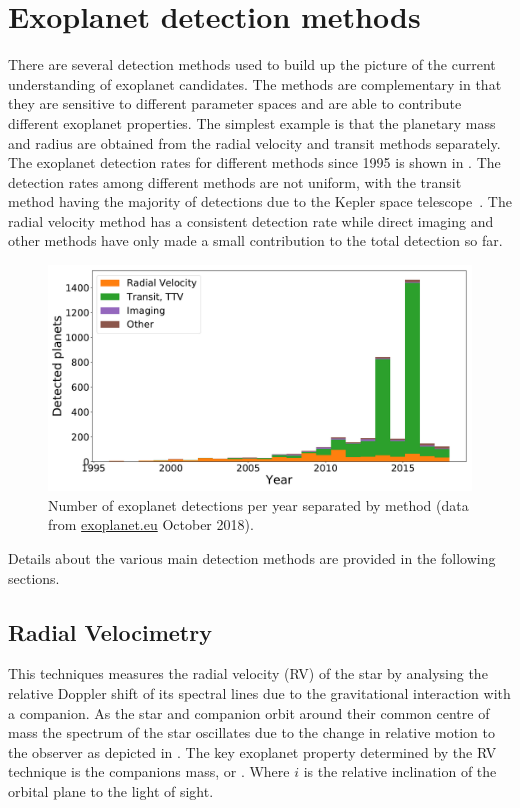 \section{Exoplanet detection methods}
\label{sec:detection_methods}
There are several detection methods used to build up the picture of the current understanding of exoplanet candidates.
The methods are complementary in that they are sensitive to different parameter spaces and are able to contribute different exoplanet properties.
The simplest example is that the planetary mass and radius are obtained from the radial velocity and transit methods separately.
The exoplanet detection rates for different methods since 1995 is shown in .
The detection rates among different methods are not uniform, with the transit method having the majority of detections due to the Kepler space telescope~\citep{borucki_finding_2008}.
The radial velocity method has a consistent detection rate while direct imaging and other methods have only made a small contribution to the total detection so far.

\begin{figure}
    \centering
    \includegraphics[width=0.7\linewidth]{./figures/introduction/exoplanetEU_year_method.pdf}
    \caption{Number of exoplanet detections per year separated by method (data from \href{http://ww.exoplanet.eu}{exoplanet.eu} October 2018).}
    \label{fig:detection_year_method}
\end{figure}


Details about the various main detection methods are provided in the following sections.

\subsection{Radial Velocimetry}
\label{sub:radial_velocimetry}
This techniques measures the radial velocity (RV) of the star by analysing the relative Doppler shift of its spectral lines due to the gravitational interaction with a companion.
As the star and companion orbit around their common centre of mass the spectrum of the star oscillates due to the change in relative motion to the observer as depicted in .
The key exoplanet property determined by the {RV} technique is the companions mass, or \mtwosini.
Where $i$ is the relative inclination of the orbital plane to the light of sight.

